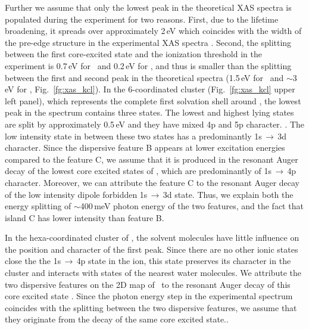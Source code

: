 Further we assume that only the lowest peak in the theoretical XAS spectra  is populated during the experiment for two reasons. First, due to the lifetime broadening, it spreads over approximately 2\,eV which coincides with the width of the pre-edge structure in the experimental XAS spectra . Second, the splitting between the first core-excited state and the ionization threshold in the experiment is 0.7\,eV for \ki~and 0.2\,eV for \cli, and thus is smaller than the splitting between the first and second peak in the theoretical spectra (1.5\,eV for \ki~and $\sim$3\,eV for \cli, Fig.\ \ref{fg:xas_kcl}). In the 6-coordinated cluster (Fig.\ \ref{fg:xas_kcl} upper left panel), which represents the complete first solvation shell around \ki, the lowest peak in the spectrum contains three states. The lowest and highest lying states are split by approximately 0.5\,eV and they have mixed 4p and 5p character. . The low intensity state in between these two states has a predominantly 1s$\,\rightarrow\,$3d character. Since the dispersive feature B appears at lower excitation energies compared to the feature C, we assume that it is produced in the resonant Auger decay of the lowest core excited states of \ki, which are predominantly of 1s$\,\rightarrow\,$4p character. Moreover, we can attribute the feature C to the resonant Auger decay of the low intensity dipole forbidden 1s$\,\rightarrow\,$3d state. Thus, we explain both the energy splitting of $\sim$400\,meV photon energy of the two features, and the fact that island C has lower intensity than feature B.


In the hexa-coordinated cluster of \cli, the solvent molecules have little influence on the position and character of the first peak. Since there are no other ionic states close the the 1s$\,\rightarrow\,$4p state in the ion, this state preserves its character in the cluster and interacts with states of the nearest water molecules. We attribute the two dispersive features on the 2D map of \cli~to the resonant Auger decay of this core excited state . {\color{red}Since the photon energy step in the experimental spectrum coincides with the splitting between the two dispersive features, we assume that they originate from the decay of the same core excited state.}.


